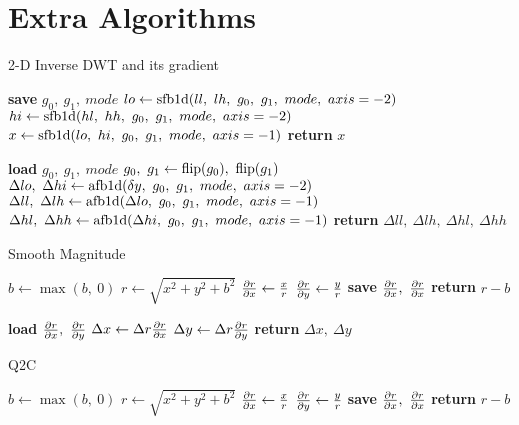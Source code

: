 \section{Extra Algorithms}
\begin{algorithm}[h!]
\caption{2-D Inverse DWT and its gradient}\label{alg:ch3:idwt}
\begin{algorithmic}[1]
  \State \textbf{save} $g_0,\ g_1,\ mode$  \label{line:ch3:idwt_save}
  \State $lo \gets \F{sfb1d}(ll,\ lh,\ g_0,\ g_1,\ mode,\ axis=-2) $
  \State $hi \gets \F{sfb1d}(hl,\ hh,\ g_0,\ g_1,\ mode,\ axis=-2) $
  \State $x \gets \mathrm{sfb1d}(lo,\ hi,\ g_0,\ g_1,\ mode,\ axis=-1) $
  \State \textbf{return} $x$
\EndFunction
\end{algorithmic}\vspace{10pt}
\begin{algorithmic}[1]
  \State \textbf{load} $g_0,\ g_1,\ mode$
  \State $ g_0,\ g_1 \gets \F{flip}(g_0),\ \F{flip}(g_1) $
  \State $\Delta lo,\ \Delta hi \gets \mathrm{afb1d}(\delta y,\ g_0,\ g_1,\ mode,\ axis=-2)$ 
  \State $\Delta ll,\ \Delta lh \gets \F{afb1d}(\Delta lo,\ g_0,\ g_1,\ mode,\ axis=-1)$ 
  \State $\Delta hl,\ \Delta hh \gets \F{afb1d}(\Delta hi,\ g_0,\ g_1,\ mode,\ axis=-1)$ 
  \State \textbf{return} $\Delta ll,\ \Delta lh,\ \Delta hl,\ \Delta hh$
\EndFunction
\end{algorithmic}
\end{algorithm}

\begin{algorithm}[tb]
\caption{Smooth Magnitude}\label{alg:ch3:mag_smooth}
\begin{algorithmic}[1]
  \State $b \gets \max(b,\ 0)$
  \State $r \gets \sqrt{x^2 + y^2 + b^2}$
  \State $\frac{\partial r}{\partial x} \gets \frac{x}{r}$
  \State $\frac{\partial r}{\partial y} \gets \frac{y}{r}$
  \State \textbf{save} $\dydx{r}{x},\ \dydx{r}{x}$
  \State \textbf{return} $r - b$
\EndFunction
\end{algorithmic}\vspace{10pt}
\begin{algorithmic}[1]
  \State \textbf{load} $\dydx{r}{x},\ \dydx{r}{y}$
  \State $\Delta x \gets \Delta r \frac{\partial r}{\partial x}$
  \State $\Delta y \gets \Delta r \frac{\partial r}{\partial y}$
  \State \textbf{return} $\Delta x,\ \Delta y$
\EndFunction
\end{algorithmic}
\end{algorithm}

\begin{algorithm}[tb]
\caption{Q2C}\label{alg:ch3:q2c}
\begin{algorithmic}[1]
  \State $b \gets \max(b,\ 0)$
  \State $r \gets \sqrt{x^2 + y^2 + b^2}$
  \State $\frac{\partial r}{\partial x} \gets \frac{x}{r}$
  \State $\frac{\partial r}{\partial y} \gets \frac{y}{r}$
  \State \textbf{save} $\dydx{r}{x},\ \dydx{r}{x}$
  \State \textbf{return} $r - b$
\EndFunction
\end{algorithmic}\vspace{10pt}
\end{algorithm}
